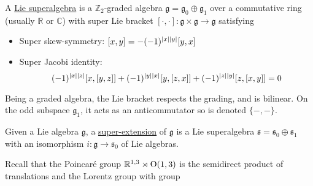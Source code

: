 \begin{defn}
	A \underline{Lie superalgebra} is a 
	$\mathbb{Z}_2$-graded algebra $\mathfrak{g} = \mathfrak{g}_0 \oplus \mathfrak{g}_1$ 
	over a commutative ring (usually $\mathbb{R}$ or $\mathbb{C}$)  with 
	super Lie bracket $[\cdot,\cdot]:\mathfrak{g}\times \mathfrak{g} \to \mathfrak{g}$ satisfying 
	\begin{itemize}
		\item Super skew-symmetry: $[x,y] = -(-1)^{\abs{x}\abs{y}}[y,x]$
		\item Super Jacobi identity: 
		\[
			(-1)^{\abs{x}\abs{z}}[x,[y,z]]+(-1)^{\abs{y}\abs{x}}[y,[z,x]]
			+(-1)^{\abs{z}\abs{y}}[z,[x,y]]=0
		\]
	\end{itemize}
\end{defn}
Being a graded algebra, the Lie bracket respects the grading, and 
is bilinear. On the odd subspace $\mathfrak{g}_1$, it acts as an
anticommutator so is denoted $\{-,-\}$. 
\begin{defn}
	Given a Lie algebra $\mathfrak{g}$, a \underline{super-extension} of
	$\mathfrak{g}$ is a Lie superalgebra  $\mathfrak{s} =
	\mathfrak{s}_0\oplus\mathfrak{s}_1$ with an isomorphism  $i:\mathfrak{g}\to
	\mathfrak{s}_0$ of Lie algebras. 
\end{defn}
\begin{comment}
\begin{prop} %
	\label{prop:super_ext}
	Given a Lie algebra $\mathfrak{g}$, a choice of super-extension
	$\mathfrak{g}\to\mathfrak{s}$ is equivalently the following data:
	 \begin{enumerate}[1.]
		 \item a vector space $S$, representing the odd part of $\mathfrak{s}$
		 \item a Lie algebra homomorphism $\rho : \mathfrak{g} \to
			 \mathfrak{gl}(S)$, representing the action of $[-,-] :
			 \mathfrak{g}\otimes S \to S$
		 \item a symmetric bilinear map $\{-,-\}:S\otimes S \to \mathfrak{g}$, 
			 representing the action of  $\{-,-\}$, such that for all
			 $X\in\mathfrak{g}$
			  \[
				  \rho_X\{-,-\} = \{\rho_X(-),-\} + \{-,\rho_X(-)\}
			 \] 
			 and $\rho_{\{\psi,\psi\}}(\psi) = 0$ for all $\psi\in S$.
	\end{enumerate}
\end{prop}
\end{comment}
Recall that the Poincar\'e group $\mathbb{R}^{1,3} \rtimes {\operatorname{O}}(1,3)$ is the 
semidirect product of translations and the Lorentz group with group
